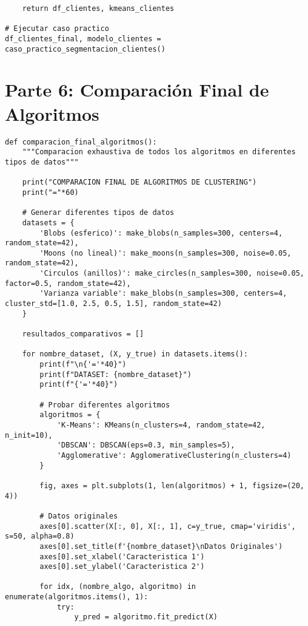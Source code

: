 \documentclass[12pt]{article}
\begin{document}
\begin{lstlisting}
    return df_clientes, kmeans_clientes

# Ejecutar caso practico
df_clientes_final, modelo_clientes = caso_practico_segmentacion_clientes()
\end{lstlisting}

\section{Parte 6: Comparación Final de Algoritmos}

\begin{lstlisting}
def comparacion_final_algoritmos():
    """Comparacion exhaustiva de todos los algoritmos en diferentes tipos de datos"""
    
    print("COMPARACION FINAL DE ALGORITMOS DE CLUSTERING")
    print("="*60)
    
    # Generar diferentes tipos de datos
    datasets = {
        'Blobs (esferico)': make_blobs(n_samples=300, centers=4, random_state=42),
        'Moons (no lineal)': make_moons(n_samples=300, noise=0.05, random_state=42),
        'Circulos (anillos)': make_circles(n_samples=300, noise=0.05, factor=0.5, random_state=42),
        'Varianza variable': make_blobs(n_samples=300, centers=4, cluster_std=[1.0, 2.5, 0.5, 1.5], random_state=42)
    }
    
    resultados_comparativos = []
    
    for nombre_dataset, (X, y_true) in datasets.items():
        print(f"\n{'='*40}")
        print(f"DATASET: {nombre_dataset}")
        print(f"{'='*40}")
        
        # Probar diferentes algoritmos
        algoritmos = {
            'K-Means': KMeans(n_clusters=4, random_state=42, n_init=10),
            'DBSCAN': DBSCAN(eps=0.3, min_samples=5),
            'Agglomerative': AgglomerativeClustering(n_clusters=4)
        }
        
        fig, axes = plt.subplots(1, len(algoritmos) + 1, figsize=(20, 4))
        
        # Datos originales
        axes[0].scatter(X[:, 0], X[:, 1], c=y_true, cmap='viridis', s=50, alpha=0.8)
        axes[0].set_title(f'{nombre_dataset}\nDatos Originales')
        axes[0].set_xlabel('Caracteristica 1')
        axes[0].set_ylabel('Caracteristica 2')
        
        for idx, (nombre_algo, algoritmo) in enumerate(algoritmos.items(), 1):
            try:
                y_pred = algoritmo.fit_predict(X)
                

\end{lstlisting}
\end{document}
